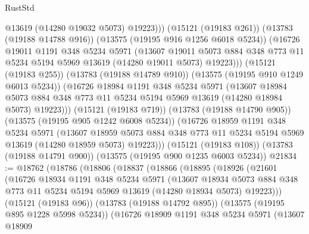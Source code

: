 \begin{lexlean}{RustStd}
\begin{coremodule}
                @13619
                (@14280 @19032 @5073)
                @19223)))
          (@15121 (@19183 @261))
          (@13783 (@19188 @14788 @916))
          (@13575 (@19195 @916 @1256 @6018 @5234))
          (@16726
            @19011
            @1191
            @348
            @5234
            @5971
            (@13607
              @19011
              @5073
              @884
              @348
              @773
              @11
              @5234
              @5194
              @5969
              @13619
              (@14280 @19011 @5073)
              @19223)))
        (@15121 (@19183 @255))
        (@13783 (@19188 @14789 @910))
        (@13575 (@19195 @910 @1249 @6013 @5234))
        (@16726
          @18984
          @1191
          @348
          @5234
          @5971
          (@13607
            @18984
            @5073
            @884
            @348
            @773
            @11
            @5234
            @5194
            @5969
            @13619
            (@14280 @18984 @5073)
            @19223)))
      (@15121 (@19183 @719))
      (@13783 (@19188 @14790 @905))
      (@13575 (@19195 @905 @1242 @6008 @5234))
      (@16726
        @18959
        @1191
        @348
        @5234
        @5971
        (@13607
          @18959
          @5073
          @884
          @348
          @773
          @11
          @5234
          @5194
          @5969
          @13619
          (@14280 @18959 @5073)
          @19223)))
    (@15121 (@19183 @108))
    (@13783 (@19188 @14791 @900))
    (@13575 (@19195 @900 @1235 @6003 @5234))
@21834 := @18762
    (@18786
      (@18806
        (@18837
          (@18866
            (@18895
              (@18926
                (@21601
                  (@16726
                    @18934
                    @1191
                    @348
                    @5234
                    @5971
                    (@13607
                      @18934
                      @5073
                      @884
                      @348
                      @773
                      @11
                      @5234
                      @5194
                      @5969
                      @13619
                      (@14280 @18934 @5073)
                      @19223)))
                (@15121 (@19183 @96))
                (@13783 (@19188 @14792 @895))
                (@13575 (@19195 @895 @1228 @5998 @5234))
                (@16726
                  @18909
                  @1191
                  @348
                  @5234
                  @5971
                  (@13607
                    @18909

\end{coremodule}
\end{lexlean}
